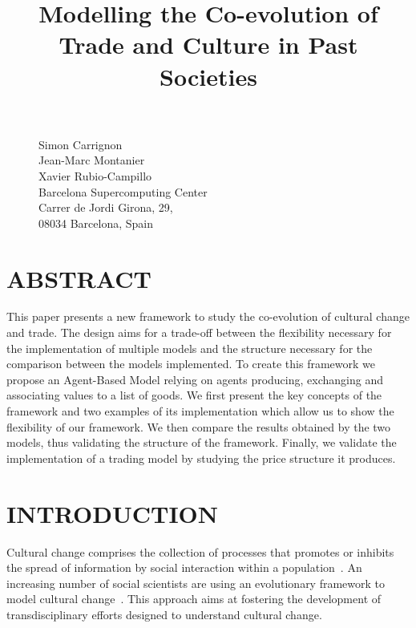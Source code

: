 \documentclass{wscpaperproc}
\begin{document}

\title{Modelling the Co-evolution of Trade and Culture in Past Societies}

\maketitle

\begin{figure}[htb]
{
\centering
Simon Carrignon\\ 
Jean-Marc Montanier\\
Xavier Rubio-Campillo\\
\vspace{12pt}
Barcelona Supercomputing Center\\
Carrer de Jordi Girona, 29, \\
08034 Barcelona, Spain\\
}
\end{figure}


\section*{ABSTRACT}

This paper presents a new framework to study the co-evolution of cultural change and trade. The design aims for a trade-off between the flexibility necessary for the implementation of multiple models and the structure necessary for the comparison between the models implemented. To create this framework we propose an Agent-Based Model relying on agents producing, exchanging and associating values to a list of goods. We first present the key concepts of the framework and two examples of its implementation which allow us to show the flexibility of our framework. We then compare the results obtained by the two models, thus validating the structure of the framework. Finally, we validate the implementation of a trading model by studying the price structure it produces.


\section{INTRODUCTION}\label{sec:intro}


Cultural change comprises the collection of processes that promotes or inhibits the spread of information by social interaction within a population~\cite{boyd_origin_2005}. An increasing number of social scientists are using an evolutionary framework to model cultural change~\cite{henrich_evolution_2003}. This approach aims at fostering the development of transdisciplinary efforts designed to understand cultural change.
\end{document}
